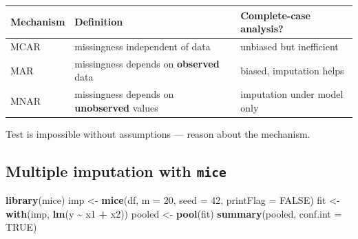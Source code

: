 \documentclass[
]{article}
\newenvironment{Shaded}{\begin{snugshade}}{\end{snugshade}}
\newcommand{\AttributeTok}[1]{\textcolor[rgb]{0.13,0.29,0.53}{#1}}
\newcommand{\ConstantTok}[1]{\textcolor[rgb]{0.56,0.35,0.01}{#1}}
\newcommand{\DecValTok}[1]{\textcolor[rgb]{0.00,0.00,0.81}{#1}}
\newcommand{\FunctionTok}[1]{\textcolor[rgb]{0.13,0.29,0.53}{\textbf{#1}}}
\newcommand{\NormalTok}[1]{#1}
\newcommand{\OtherTok}[1]{\textcolor[rgb]{0.56,0.35,0.01}{#1}}
\newcommand{\SpecialCharTok}[1]{\textcolor[rgb]{0.81,0.36,0.00}{\textbf{#1}}}
\newcounter{none} %
\begin{document}
{\def\LTcaptype{none} %
\begin{longtable}[]{@{}
  >{\raggedright\arraybackslash}p{}
  >{\raggedright\arraybackslash}p{}
  >{\raggedright\arraybackslash}p{}@{}}
\toprule\noalign{}
\begin{minipage}[b]{\linewidth}\raggedright
Mechanism
\end{minipage} & \begin{minipage}[b]{\linewidth}\raggedright
Definition
\end{minipage} & \begin{minipage}[b]{\linewidth}\raggedright
Complete-case analysis?
\end{minipage} \\
\midrule\noalign{}
\endhead
\bottomrule\noalign{}
\endlastfoot
MCAR & missingness independent of data & unbiased but inefficient \\
MAR & missingness depends on \textbf{observed} data & biased, imputation
helps \\
MNAR & missingness depends on \textbf{unobserved} values & imputation
under model only \\
\end{longtable}
}

Test is impossible without assumptions --- reason about the mechanism.

\subsection{\texorpdfstring{Multiple imputation with
\texttt{mice}}{Multiple imputation with mice}}\label{multiple-imputation-with-mice}

\begin{Shaded}
\begin{Highlighting}[]
\FunctionTok{library}\NormalTok{(mice)}
\NormalTok{imp }\OtherTok{\textless{}{-}} \FunctionTok{mice}\NormalTok{(df, }\AttributeTok{m =} \DecValTok{20}\NormalTok{, }\AttributeTok{seed =} \DecValTok{42}\NormalTok{, }\AttributeTok{printFlag =} \ConstantTok{FALSE}\NormalTok{)}
\NormalTok{fit }\OtherTok{\textless{}{-}} \FunctionTok{with}\NormalTok{(imp, }\FunctionTok{lm}\NormalTok{(y }\SpecialCharTok{\textasciitilde{}}\NormalTok{ x1 }\SpecialCharTok{+}\NormalTok{ x2))}
\NormalTok{pooled }\OtherTok{\textless{}{-}} \FunctionTok{pool}\NormalTok{(fit)}
\FunctionTok{summary}\NormalTok{(pooled, }\AttributeTok{conf.int =} \ConstantTok{TRUE}\NormalTok{)}
\end{Highlighting}
\end{Shaded}
\end{document}
